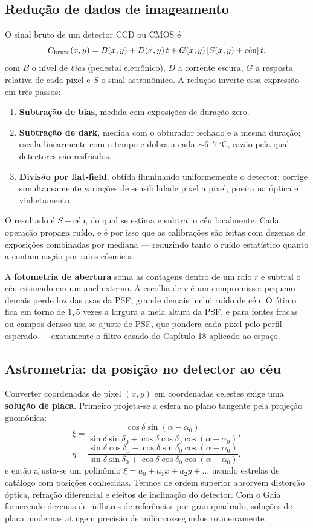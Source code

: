 \documentclass[11pt,a4paper]{article}
\begin{document}
\subsection*{Redução de dados de imageamento}

O sinal bruto de um detector CCD ou CMOS é
\[
C_{\rm bruto}(x,y)=B(x,y)+D(x,y)\,t+G(x,y)\left[S(x,y)+\text{céu}\right]t,
\]
com $B$ o nível de \textit{bias} (pedestal eletrônico), $D$ a corrente escura, $G$ a resposta relativa de cada pixel e $S$ o sinal astronômico. A redução inverte essa expressão em três passos:

\begin{enumerate}
\item \textbf{Subtração de bias}, medida com exposições de duração zero.
\item \textbf{Subtração de dark}, medida com o obturador fechado e a mesma duração; escala linearmente com o tempo e dobra a cada $\sim6$--$7\,^\circ$C, razão pela qual detectores são resfriados.
\item \textbf{Divisão por flat-field}, obtida iluminando uniformemente o detector; corrige simultaneamente variações de sensibilidade pixel a pixel, poeira na óptica e vinhetamento.
\end{enumerate}

O resultado é $S+\text{céu}$, do qual se estima e subtrai o céu localmente. Cada operação propaga ruído, e é por isso que as calibrações são feitas com dezenas de exposições combinadas por mediana --- reduzindo tanto o ruído estatístico quanto a contaminação por raios cósmicos.

A \textbf{fotometria de abertura} soma as contagens dentro de um raio $r$ e subtrai o céu estimado em um anel externo. A escolha de $r$ é um compromisso: pequeno demais perde luz das asas da PSF, grande demais inclui ruído de céu. O ótimo fica em torno de $1{,}5$ vezes a largura a meia altura da PSF, e para fontes fracas ou campos densos usa-se ajuste de PSF, que pondera cada pixel pelo perfil esperado --- exatamente o filtro casado do Capítulo 18 aplicado ao espaço.

\subsection*{Astrometria: da posição no detector ao céu}

Converter coordenadas de pixel $(x,y)$ em coordenadas celestes exige uma \textbf{solução de placa}. Primeiro projeta-se a esfera no plano tangente pela projeção gnomônica:
\[
\xi=\frac{\cos\delta\sin(\alpha-\alpha_0)}{\sin\delta\sin\delta_0+\cos\delta\cos\delta_0\cos(\alpha-\alpha_0)},
\]
\[
\eta=\frac{\sin\delta\cos\delta_0-\cos\delta\sin\delta_0\cos(\alpha-\alpha_0)}{\sin\delta\sin\delta_0+\cos\delta\cos\delta_0\cos(\alpha-\alpha_0)},
\]
e então ajusta-se um polinômio $\xi=a_0+a_1x+a_2y+\ldots$ usando estrelas de catálogo com posições conhecidas. Termos de ordem superior absorvem distorção óptica, refração diferencial e efeitos de inclinação do detector. Com o Gaia fornecendo dezenas de milhares de referências por grau quadrado, soluções de placa modernas atingem precisão de miliarcossegundos rotineiramente.
\end{document}
